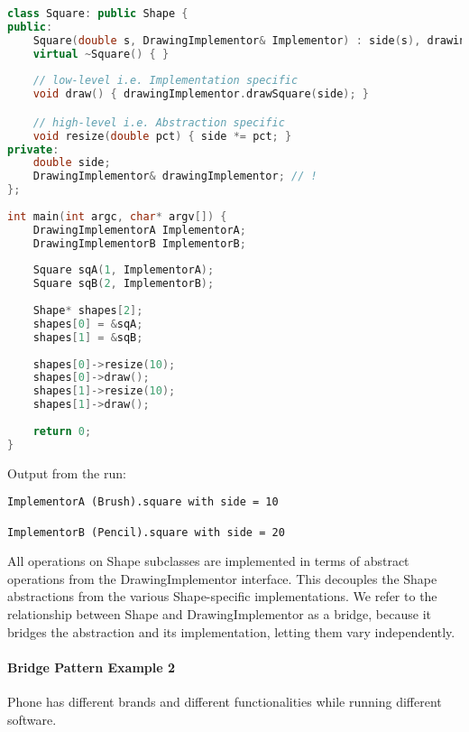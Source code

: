\documentclass{book}
\begin{document}
\begin{lstlisting}[caption={Facade Pattern sample 3}, language=C++]
class Square: public Shape {
public:
    Square(double s, DrawingImplementor& Implementor) : side(s), drawingImplementor(Implementor) { }
    virtual ~Square() { }
 
    // low-level i.e. Implementation specific
    void draw() { drawingImplementor.drawSquare(side); }

    // high-level i.e. Abstraction specific
    void resize(double pct) { side *= pct; }
private:
    double side;
    DrawingImplementor& drawingImplementor; // !
};
 
int main(int argc, char* argv[]) {
    DrawingImplementorA ImplementorA;
    DrawingImplementorB ImplementorB;
 
    Square sqA(1, ImplementorA);
    Square sqB(2, ImplementorB);
 
    Shape* shapes[2];
    shapes[0] = &sqA;
    shapes[1] = &sqB;
 
    shapes[0]->resize(10);
    shapes[0]->draw();
    shapes[1]->resize(10);
    shapes[1]->draw();
 
    return 0;
}
\end{lstlisting}
Output from the run:
\begin{verbatim}
ImplementorA (Brush).square with side = 10

ImplementorB (Pencil).square with side = 20
\end{verbatim}

All operations on Shape subclasses are implemented in terms of abstract operations from the DrawingImplementor interface.
This decouples the Shape abstractions from the various Shape-specific implementations.
We refer to the relationship between Shape and DrawingImplementor as a bridge, because it bridges the abstraction and its implementation, letting them vary independently.
\paragraph{Bridge Pattern Example 2}
Phone has different brands and different functionalities while running different software.
\end{document}
